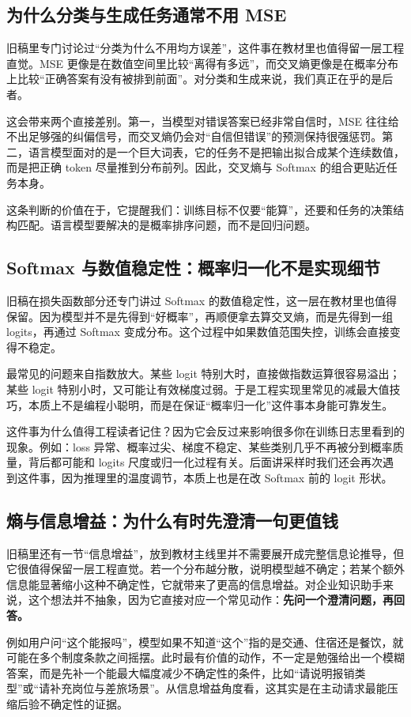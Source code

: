 \subsection{为什么分类与生成任务通常不用 MSE}
旧稿里专门讨论过“分类为什么不用均方误差”，这件事在教材里也值得留一层工程直觉。MSE 更像是在数值空间里比较“离得有多远”，而交叉熵更像是在概率分布上比较“正确答案有没有被排到前面”。对分类和生成来说，我们真正在乎的是后者。

这会带来两个直接差别。第一，当模型对错误答案已经非常自信时，MSE 往往给不出足够强的纠偏信号，而交叉熵仍会对“自信但错误”的预测保持很强惩罚。第二，语言模型面对的是一个巨大词表，它的任务不是把输出拟合成某个连续数值，而是把正确 token 尽量推到分布前列。因此，交叉熵与 Softmax 的组合更贴近任务本身。

这条判断的价值在于，它提醒我们：训练目标不仅要“能算”，还要和任务的决策结构匹配。语言模型要解决的是概率排序问题，而不是回归问题。

\subsection{Softmax 与数值稳定性：概率归一化不是实现细节}
旧稿在损失函数部分还专门讲过 Softmax 的数值稳定性，这一层在教材里也值得保留。因为模型并不是先得到“好概率”，再顺便拿去算交叉熵，而是先得到一组 logits，再通过 Softmax 变成分布。这个过程中如果数值范围失控，训练会直接变得不稳定。

最常见的问题来自指数放大。某些 logit 特别大时，直接做指数运算很容易溢出；某些 logit 特别小时，又可能让有效梯度过弱。于是工程实现里常见的减最大值技巧，本质上不是编程小聪明，而是在保证“概率归一化”这件事本身能可靠发生。

这件事为什么值得工程读者记住？因为它会反过来影响很多你在训练日志里看到的现象。例如：loss 异常、概率过尖、梯度不稳定、某些类别几乎不再被分到概率质量，背后都可能和 logits 尺度或归一化过程有关。后面讲采样时我们还会再次遇到这件事，因为推理里的温度调节，本质上也是在改 Softmax 前的 logit 形状。

\subsection{熵与信息增益：为什么有时先澄清一句更值钱}
旧稿里还有一节“信息增益”，放到教材主线里并不需要展开成完整信息论推导，但它很值得保留一层工程直觉。若一个分布越分散，说明模型越不确定；若某个额外信息能显著缩小这种不确定性，它就带来了更高的信息增益。对企业知识助手来说，这个想法并不抽象，因为它直接对应一个常见动作：\textbf{先问一个澄清问题，再回答。}

例如用户问“这个能报吗”，模型如果不知道“这个”指的是交通、住宿还是餐饮，就可能在多个制度条款之间摇摆。此时最有价值的动作，不一定是勉强给出一个模糊答案，而是先补一个能最大幅度减少不确定性的条件，比如“请说明报销类型”或“请补充岗位与差旅场景”。从信息增益角度看，这其实是在主动请求最能压缩后验不确定性的证据。

